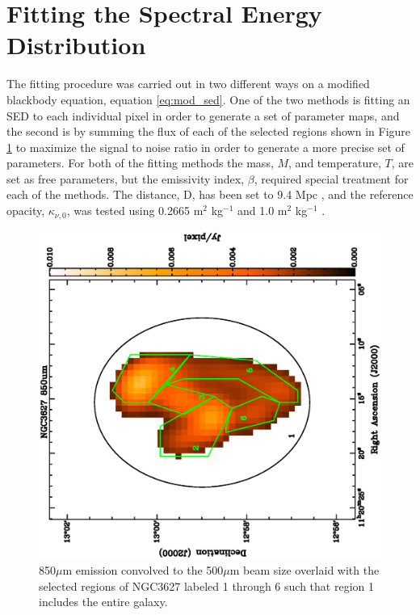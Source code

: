 \section{Fitting the Spectral Energy Distribution}

The fitting procedure was carried out in two different ways on a modified blackbody equation, equation \ref{eq:mod_sed}.  One of the two methods is fitting an SED to each individual pixel in order to generate a set of parameter maps, and the second is by summing the flux of each of the selected regions shown in Figure \ref{fig:regions} to maximize the signal to noise ratio in order to generate a more precise set of parameters.  For both of the fitting methods the mass, $M$, and temperature, $T$, are set as free parameters, but the emissivity index, $\beta$, required special treatment for each of the methods.  The distance, D, has been set to 9.4 Mpc \citep{walter2008}, and the reference opacity, $\kappa_{\nu,0}$, was tested using 0.2665 m$^2$ kg$^{-1}$ \citep{li2001} and 1.0 m$^2$ kg$^{-1}$ \citep{planckxxv2011}.

\begin{figure}
  \centering
  \includegraphics[width=1.\textwidth,angle=270]{sed_imgs/regions.eps}
  \caption[NGC3627 Regions]{850$\mu$m emission convolved to the 500$\mu$m beam size overlaid with the selected regions of NGC3627 labeled 1 through 6 such that region 1 includes the entire galaxy.}
  \label{fig:regions}
\end{figure}

